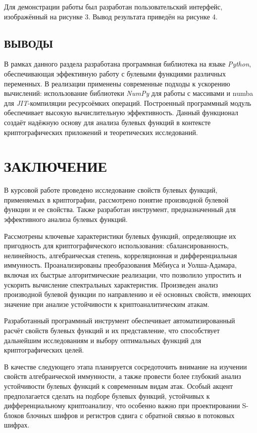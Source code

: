 \begin{itemize}
    Для демонстрации работы был разработан пользовательский интерфейс, изображённый на рисунке 3. Вывод результата приведён на рисунке 4.
  
\end{itemize}
\subsection*{ВЫВОДЫ}
В рамках данного раздела разработана программная библиотека на языке \textit{Python}, обеспечивающая эффективную работу с булевыми функциями различных переменных. 
В реализации применены современные подходы к ускорению вычислений: использование библиотеки \textit{NumPy} для работы с массивами и numba для \textit{JIT}-компиляции ресурсоёмких операций.
Построенный программный модуль обеспечивает высокую вычислительную эффективность. Данный функционал создаёт надёжную основу для анализа булевых функций в контексте криптографических приложений и теоретических исследований.
\newpage 
\section*{ЗАКЛЮЧЕНИЕ}
В курсовой работе проведено исследование свойств булевых функций, применяемых в криптографии, рассмотрено понятие производной булевой функции и ее свойства. Также разработан инструмент, предназначенный для эффективного анализа булевых функций.

Рассмотрены ключевые характеристики булевых функций, определяющие их пригодность для криптографического использования: сбалансированность, нелинейность, алгебраическая степень, корреляционная и дифференциальная иммунность. Проанализированы преобразования Мёбиуса и Уолша-Адамара, включая их быстрые алгоритмические реализации, что позволило упростить и ускорить вычисление спектральных характеристик. Произведен анализ производной булевой функции по направлению и её основных свойств, имеющих значение при анализе устойчивости к криптоаналитическим атакам.

Разработанный программный инструмент обеспечивает автоматизированный расчёт свойств булевых функций и их  представление, что способствует дальнейшим исследованиям и выбору оптимальных функций для криптографических целей.

В качестве следующего этапа планируется сосредоточить внимание на изучении свойств алгебраической иммунности, а также провести более глубокий анализ устойчивости булевых функций к современным видам атак.
Особый акцент предполагается сделать на подборе булевых функций, устойчивых к дифференциальному криптоанализу, что особенно важно при проектировании S-блоков блочных шифров и регистров сдвига с обратной связью в потоковых шифрах.

